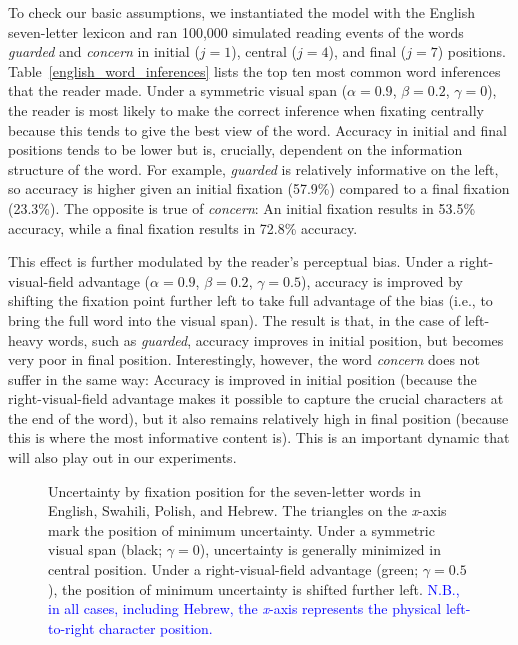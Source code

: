 \documentclass[doc,biblatex]{apa7}
\newcommand\newmaterial[1]{\textcolor{blue}{#1}}
\begin{document}
To check our basic assumptions, we instantiated the model with the English seven-letter lexicon and ran 100,000 simulated reading events of the words \textit{guarded} and \textit{concern} in initial ($j=1$), central ($j=4$), and final ($j=7$) positions. Table~\ref{english_word_inferences} lists the top ten most common word inferences that the reader made. Under a symmetric visual span ($\alpha = 0.9$, $\beta = 0.2$, $\gamma = 0$), the reader is most likely to make the correct inference when fixating centrally because this tends to give the best view of the word. Accuracy in initial and final positions tends to be lower but is, crucially, dependent on the information structure of the word. For example, \textit{guarded} is relatively informative on the left, so accuracy is higher given an initial fixation (57.9\%) compared to a final fixation (23.3\%). The opposite is true of \textit{concern}: An initial fixation results in 53.5\% accuracy, while a final fixation results in 72.8\% accuracy.

This effect is further modulated by the reader's perceptual bias. Under a right-visual-field advantage ($\alpha = 0.9$, $\beta = 0.2$, $\gamma = 0.5$), accuracy is improved by shifting the fixation point further left to take full advantage of the bias (i.e., to bring the full word into the visual span). The result is that, in the case of left-heavy words, such as \textit{guarded}, accuracy improves in initial position, but becomes very poor in final position. Interestingly, however, the word \textit{concern} does not suffer in the same way: Accuracy is improved in initial position (because the right-visual-field advantage makes it possible to capture the crucial characters at the end of the word), but it also remains relatively high in final position (because this is where the most informative content is). This is an important dynamic that will also play out in our experiments.

\begin{figure}
\vspace*{2pt}
\caption{Uncertainty by fixation position for the seven-letter words in English, Swahili, Polish, and Hebrew. The triangles on the \textit{x}-axis mark the position of minimum uncertainty. Under a symmetric visual span (black; $\gamma=0$), uncertainty is generally minimized in central position. Under a right-visual-field advantage (green; $\gamma=0.5$), the position of minimum uncertainty is shifted further left. \newmaterial{N.B., in all cases, including Hebrew, the \textit{x}-axis represents the physical left-to-right character position.}}
\label{fig02}
\end{figure}
\end{document}
